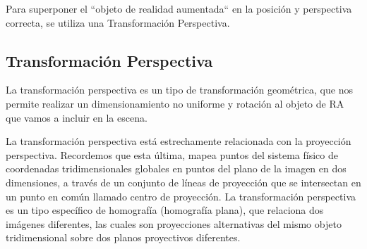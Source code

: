 Para superponer el ``objeto de realidad aumentada`` en la posición y perspectiva correcta, se utiliza una Transformación Perspectiva.
\subsection{Transformación Perspectiva}
La transformación perspectiva es un tipo de transformación geométrica, que nos permite realizar un dimensionamiento no uniforme y rotación al objeto de RA que vamos a incluir en la escena.

La transformación perspectiva está estrechamente relacionada con la proyección perspectiva. Recordemos que esta última, mapea puntos del sistema físico de coordenadas tridimensionales globales en puntos del plano de la imagen en dos dimensiones, a través de un conjunto de líneas de proyección que se intersectan en un punto en común llamado centro de proyección.
La transformación perspectiva es un tipo específico de homografía (homografía plana), que relaciona dos imágenes diferentes, las cuales son proyecciones alternativas del mismo objeto tridimensional sobre dos planos proyectivos diferentes.%

